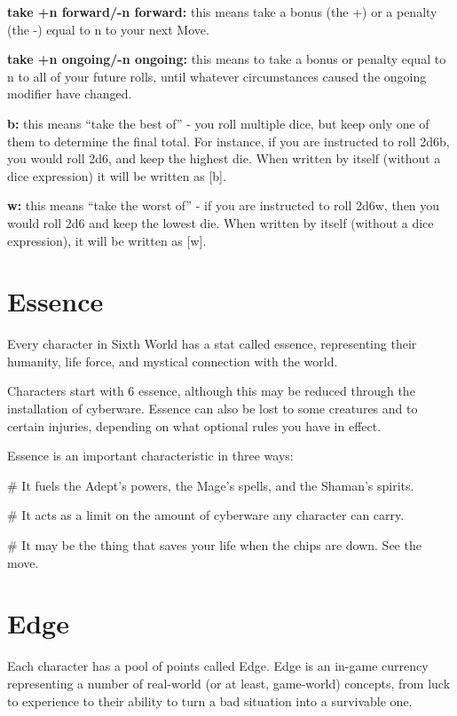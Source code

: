 \textbf{take +n forward/-n forward:} this means take a bonus (the +) or a penalty (the -) equal to n to your next Move.

\textbf{take +n ongoing/-n ongoing:} this means to take a bonus or penalty equal to n to all of your future rolls, until whatever circumstances caused the ongoing modifier have changed.

\textbf{b:} this means ``take the best of'' - you roll multiple dice, but keep only one of them to determine the final total. For instance, if you are instructed to roll 2d6b, you would roll 2d6, and keep the highest die. When written by itself (without a dice expression) it will be written as [b].

\textbf{w:} this means ``take the worst of'' - if you are instructed to roll 2d6w, then you would roll 2d6 and keep the lowest die. When written by itself (without a dice expression), it will be written as [w].


\section{Essence}

Every character in Sixth World has a stat called essence, representing their humanity, life force, and mystical connection with the world.

Characters start with 6 essence, although this may be reduced through the installation of cyberware. Essence can also be lost to some creatures and to certain injuries, depending on what optional rules you have in effect.

Essence is an important characteristic in three ways:

\begin{easylist}
# It fuels the Adept’s powers, the Mage’s spells, and the Shaman’s spirits.

# It acts as a limit on the amount of cyberware any character can carry.

# It may be the thing that saves your life when the chips are down. See the  move.
\end{easylist}


\section{Edge}

Each character has a pool of points called Edge. Edge is an in-game currency representing a number of real-world (or at least, game-world) concepts, from luck to experience to their ability to turn a bad situation into a survivable one.

